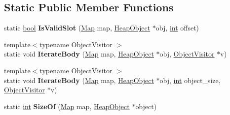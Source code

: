 \subsection*{Static Public Member Functions}
\begin{DoxyCompactItemize}
\item 
\mbox{\label{classv8_1_1internal_1_1FixedBodyDescriptor_ad40b39f0b3c80eab57c0ad7087c651d7}} 
static \mbox{\hyperlink{classbool}{bool}} {\bfseries Is\+Valid\+Slot} (\mbox{\hyperlink{classv8_1_1internal_1_1Map}{Map}} map, \mbox{\hyperlink{classv8_1_1internal_1_1HeapObject}{Heap\+Object}} $\ast$obj, \mbox{\hyperlink{classint}{int}} offset)
\item 
\mbox{\label{classv8_1_1internal_1_1FixedBodyDescriptor_a07faf3539270635e89b631f6f4184188}} 
{\footnotesize template$<$typename Object\+Visitor $>$ }\\static void {\bfseries Iterate\+Body} (\mbox{\hyperlink{classv8_1_1internal_1_1Map}{Map}} map, \mbox{\hyperlink{classv8_1_1internal_1_1HeapObject}{Heap\+Object}} $\ast$obj, \mbox{\hyperlink{classv8_1_1internal_1_1ObjectVisitor}{Object\+Visitor}} $\ast$v)
\item 
\mbox{\label{classv8_1_1internal_1_1FixedBodyDescriptor_a15d6df05290a2a1457e91eb57e9ab4f6}} 
{\footnotesize template$<$typename Object\+Visitor $>$ }\\static void {\bfseries Iterate\+Body} (\mbox{\hyperlink{classv8_1_1internal_1_1Map}{Map}} map, \mbox{\hyperlink{classv8_1_1internal_1_1HeapObject}{Heap\+Object}} $\ast$obj, \mbox{\hyperlink{classint}{int}} object\+\_\+size, \mbox{\hyperlink{classv8_1_1internal_1_1ObjectVisitor}{Object\+Visitor}} $\ast$v)
\item 
\mbox{\label{classv8_1_1internal_1_1FixedBodyDescriptor_aa13edc687f228d07e89f7529732a300c}} 
static \mbox{\hyperlink{classint}{int}} {\bfseries Size\+Of} (\mbox{\hyperlink{classv8_1_1internal_1_1Map}{Map}} map, \mbox{\hyperlink{classv8_1_1internal_1_1HeapObject}{Heap\+Object}} $\ast$object)
\end{DoxyCompactItemize}
